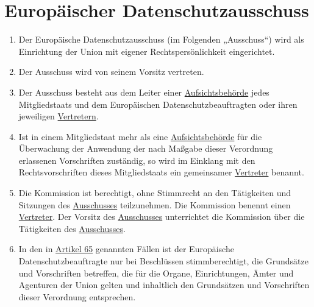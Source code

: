 \chapter{Europäischer Datenschutzausschuss}
\label{ch:68}


\begin{enumerate}

  \item Der Europäische Datenschutzausschuss (im Folgenden „Ausschuss“) wird als Einrichtung der Union mit eigener
   Rechtspersönlichkeit eingerichtet.%
  \label{itm:68-1}

  \item Der Ausschuss wird von seinem Vorsitz vertreten.%
  \label{itm:68-2}

  \item Der Ausschuss besteht aus dem Leiter einer \hyperref[itm:04-21]{Aufsichtsbehörde} jedes Mitgliedstaats und dem
   Europäischen Datenschutzbeauftragten oder ihren jeweiligen \hyperref[itm:04-17]{Vertretern}.%
  \label{itm:68-3}

  \item Ist in einem Mitgliedstaat mehr als eine \hyperref[itm:04-21]{Aufsichtsbehörde} für die Überwachung der
   Anwendung der nach Maßgabe dieser Verordnung erlassenen Vorschriften zuständig, so wird im Einklang mit den
   Rechtsvorschriften dieses Mitgliedstaats ein gemeinsamer \hyperref[itm:04-17]{Vertreter} benannt.%
  \label{itm:68-4}

  \item Die Kommission ist berechtigt, ohne Stimmrecht an den Tätigkeiten und Sitzungen des \hyperref[ch:68]{Ausschusses} teilzunehmen.
   Die Kommission benennt einen \hyperref[itm:04-17]{Vertreter}. Der Vorsitz des \hyperref[ch:68]{Ausschusses} unterrichtet die
   Kommission über die Tätigkeiten des \hyperref[ch:68]{Ausschusses}.%
  \label{itm:68-5}

  \item In den in \hyperref[ch:65]{Artikel 65} genannten Fällen ist der Europäische Datenschutzbeauftragte nur bei
   Beschlüssen stimmberechtigt, die Grundsätze und Vorschriften betreffen, die für die Organe, Einrichtungen, Ämter und
   Agenturen der Union gelten und inhaltlich den Grundsätzen und Vorschriften dieser Verordnung entsprechen.%
  \label{itm:68-6}

\end{enumerate}


